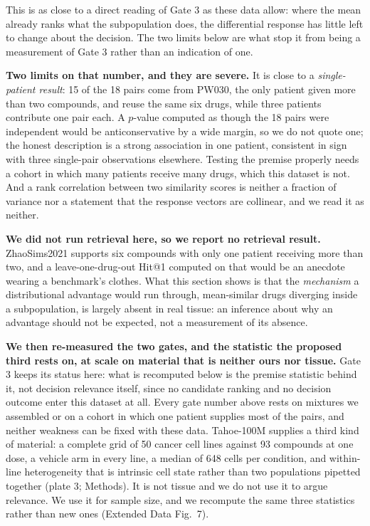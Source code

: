 \documentclass[11pt,letterpaper]{article}
\begin{document}
This is as close to a direct reading of
Gate 3 as these data allow: where the mean already ranks what the subpopulation does, the
differential response has little left to change about the decision. The two limits below are what
stop it from being a measurement of Gate 3 rather than an indication of one.

\textbf{Two limits on that number, and they are severe.} It is close to a \emph{single-patient
result}: 15 of the 18 pairs come from PW030, the only patient given more than two compounds, and
reuse the same six drugs, while three patients contribute one pair each. A $p$-value computed as
though the 18 pairs were independent would be anticonservative by a wide margin, so we do not quote
one; the honest description is a strong association in one patient, consistent in sign with three
single-pair observations elsewhere. Testing the premise properly needs a cohort in which many
patients receive many drugs, which this dataset is not. And a rank correlation between two
similarity scores is neither a fraction of variance nor a statement that the response vectors are
collinear, and we read it as neither.

\textbf{We did not run retrieval here, so we report no retrieval result.} ZhaoSims2021 supports six
compounds with only one patient receiving more than two, and a leave-one-drug-out Hit@1 computed on
that would be an anecdote wearing a benchmark's clothes. What this section shows is that the
\emph{mechanism} a distributional advantage would run through, mean-similar drugs diverging inside
a subpopulation, is largely absent in real tissue: an inference about why an advantage should not
be expected, not a measurement of its absence.

\textbf{We then re-measured the two gates, and the statistic the proposed third rests on, at scale
on material that is neither ours nor tissue.} Gate 3 keeps its status here: what is recomputed
below is the premise statistic behind it, not decision relevance itself, since no candidate
ranking and no decision outcome enter this dataset at all. Every gate number above rests on mixtures we assembled or on a cohort in which one
patient supplies most of the pairs, and neither weakness can be fixed with these data. Tahoe-100M
supplies a third kind of material: a complete grid of 50 cancer cell lines against 93 compounds at
one dose, a vehicle arm in every line, a median of 648 cells per condition, and within-line
heterogeneity that is intrinsic cell state rather than two populations pipetted together (plate 3;
Methods). It is not tissue and we do not use it to argue relevance. We use it for sample size, and
we recompute the same three statistics rather than new ones (Extended Data Fig.~7).
\end{document}
